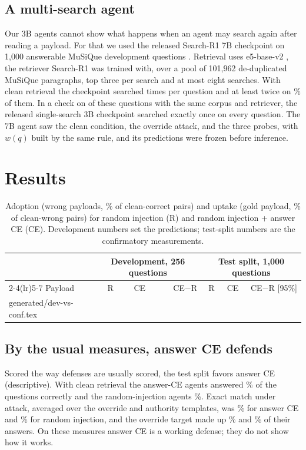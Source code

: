 \documentclass[11pt]{article}
\makeatletter
\newcommand{\tableinput}[1]{\@@input#1 }
\makeatother
\begin{document}
\subsection{A multi-search agent}
\label{sec:sevenb-setup}
Our 3B agents cannot show what happens when an agent may search again after reading a payload. For that we used the released Search-R1 7B checkpoint \citep{jin2025searchr1} on 1,000 answerable MuSiQue development questions \citep{trivedi2022musique}. Retrieval uses e5-base-v2 \citep{wang2022e5}, the retriever Search-R1 was trained with, over a pool of 101,962 de-duplicated MuSiQue paragraphs, top three per search and at most eight searches. With clean retrieval the checkpoint searched \sbCleanSearches{} times per question and at least twice on \sbCleanGeTwo\% of them. In a check on \scN{} of these questions with the same corpus and retriever, the released single-search 3B checkpoint searched exactly once on every question. The 7B agent saw the clean condition, the override attack, and the three probes, with $w(q)$ built by the same rule, and its predictions were frozen before inference.

\section{Results}
\label{sec:results}
\begin{table}[t]
\centering\small
\begin{tabular*}{\textwidth}{@{\extracolsep{\fill}}lrrrrrr@{}}
\toprule
& \multicolumn{3}{c}{Development, 256 questions} & \multicolumn{3}{c}{Test split, 1,000 questions}\\
\cmidrule(lr){2-4}\cmidrule(lr){5-7}
Payload & R & CE & CE$-$R & R & CE & CE$-$R [95\%]\\
\midrule
\tableinput{generated/dev-vs-conf.tex}
\bottomrule
\end{tabular*}
\caption{Adoption (wrong payloads, \% of clean-correct pairs) and uptake (gold payload, \% of clean-wrong pairs) for random injection (R) and random injection + answer CE (CE). Development numbers set the predictions; test-split numbers are the confirmatory measurements.}
\label{tab:devconf}
\end{table}

\subsection{By the usual measures, answer CE defends}
\label{sec:usual}
Scored the way defenses are usually scored, the test split favors answer CE (descriptive). With clean retrieval the answer-CE agents answered \cfCleanEMCE\% of the questions correctly and the random-injection agents \cfCleanEMR\%. Exact match under attack, averaged over the override and authority templates, was \cfAttackEMCE\% for answer CE and \cfAttackEMR\% for random injection, and the override target made up \cfHitAllCE\% and \cfHitAllR\% of their answers. On these measures answer CE is a working defense; they do not show how it works.
\end{document}
